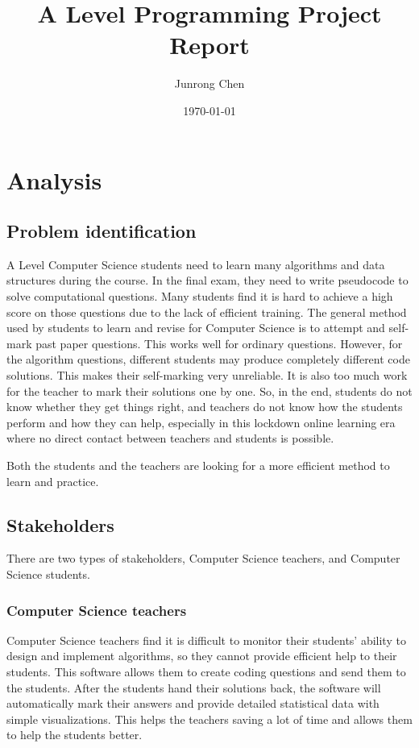 \documentclass[a4paper]{report}
\title{A Level Programming Project Report}
\author{Junrong Chen}
\date{\today}
\begin{document}
\maketitle
\tableofcontents
\clearpage
\chapter{Analysis}

\section{Problem identification}

A Level Computer Science students need to learn many algorithms and data structures during the course. In the final exam, they need to write pseudocode to solve computational questions. Many students find it is hard to achieve a high score on those questions due to the lack of efficient training. The general method used by students to learn and revise for Computer Science is to attempt and self-mark past paper questions. This works well for ordinary questions. However, for the algorithm questions, different students may produce completely different code solutions. This makes their self-marking very unreliable. It is also too much work for the teacher to mark their solutions one by one. So, in the end, students do not know whether they get things right, and teachers do not know how the students perform and how they can help, especially in this lockdown online learning era where no direct contact between teachers and students is possible.

Both the students and the teachers are looking for a more efficient method to learn and practice.

\section{Stakeholders}

There are two types of stakeholders, Computer Science teachers, and Computer Science students.

\subsection{Computer Science teachers}

Computer Science teachers find it is difficult to monitor their students' ability to design and implement algorithms, so they cannot provide efficient help to their students. This software allows them to create coding questions and send them to the students. After the students hand their solutions back, the software will automatically mark their answers and provide detailed statistical data with simple visualizations. This helps the teachers saving a lot of time and allows them to help the students better.
\end{document}
